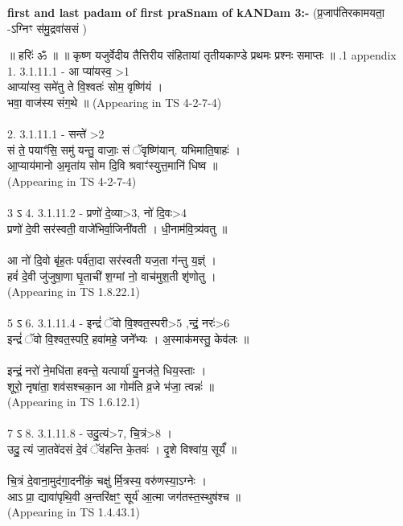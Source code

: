 \documentclass[17pt]{extarticle}
\begin{document}
        \textbf{first and last padam of first praSnam of kANDam 3:-} \newline
        (प्र॒जाप॑तिरकामयता॒ -ऽग्निꣳ स॑मु॒द्रवा॑ससं ) \newline 

        
        ॥ हरिः॑ ॐ ॥
॥ कृष्ण यजुर्वेदीय तैत्तिरीय संहितायां तृतीयकाण्डे प्रथमः प्रश्नः समाप्तः ॥ \newline
        .1   appendix\\1.      3.1.11.1 - आ प्या॑यस्व॒ >1\\आप्या॑स्व॒ समे॑तु ते वि॒श्वतः॑ सोम॒ वृष्णि॑यं ।\\भवा॒ वाज॑स्य संग॒थे ॥ (Appearing in TS 4-2-7-4)\\\\2.      3.1.11.1 - सन्ते॑ >2\\सं ते॒ पयाꣳ॑सि॒ समु॑ यन्तु॒ वाजाः॒ सं ॅवृष्णि॑यान्. यभिमाति॒षाहः॑ ।\\आ॒प्याय॑मानो अ॒मृता॑य सोम दि॒वि श्रवाꣳ॑स्युत्त॒मानि॑ धिष्व ॥ \\(Appearing in TS 4-2-7-4)\\\\3 ऽ 4. 3.1.11.2 - प्रणो॑ दे॒व्या>3, नो॑ दि॒वः>4\\प्रणो॑ दे॒वी सर॑स्वती॒ वाजे॑भिर्वा॒जिनी॑वती । धी॒नाम॑वि॒त्र्य॑वतु ॥\\\\आ नो॑ दि॒वो बृ॑ह॒तः पर्व॑ता॒दा सर॑स्वती यज॒ता ग॑न्तु य॒ज्ञ्ं । \\हवं॑ दे॒वी जु॑जुषा॒णा घृ॒ताची॑ श॒ग्मां नो॒ वाच॑मुश॒ती शृ॑णोतु ।\\(Appearing in TS 1.8.22.1)\\\\5 ऽ 6. 3.1.11.4 - इन्द्रं॑ ॅवो वि॒श्वत॒स्परी>5 ,न्द्रं॒ नरः॑>6\\इन्द्रं॑ ॅवो वि॒श्वत॒स्परि॒ हवा॑महे॒ जने᳚भ्यः । अ॒स्माक॑मस्तु॒ केव॑लः ॥ \\\\इन्द्रं॒ नरो॑ ने॒मधि॑ता हवन्ते॒ यत्पार्या॑ यु॒नज॑ते॒ धिय॒स्ताः ।\\शूरो॒ नृषा॑ता॒ शव॑सश्चका॒न आ गोम॑ति व्र॒जे भ॑जा॒ त्वन्नः॑ ॥\\(Appearing in TS 1.6.12.1)\\\\7 ऽ 8. 3.1.11.8 - उदु॒त्यं>7, चि॒त्रं>8 ।\\उदु॒ त्यं जा॒तवे॑दसं दे॒वं ॅव॑हन्ति के॒तवः॑ । दृ॒शे विश्वा॑य॒ सूर्यं᳚ ॥\\\\चि॒त्रं दे॒वाना॒मुद॑गा॒दनी॑कं॒ चक्षु॑ र्मि॒त्रस्य॒ वरु॑णस्या॒ऽग्नेः ।\\आऽ प्रा॒ द्यावा॑पृथि॒वी अ॒न्तरि॑क्षꣳ॒॒ सूर्य॑ आ॒त्मा जग॑तस्त॒स्थुष॑श्च ॥ \\(Appearing in TS 1.4.43.1)\\
                \pagebreak
        
\end{document}

